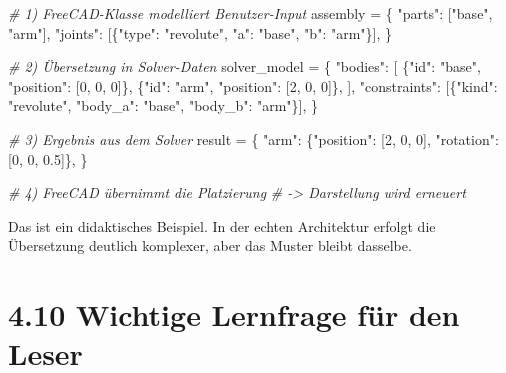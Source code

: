 \documentclass[
  12pt
]{book}
\newenvironment{Shaded}{}{}
\newcommand{\CommentTok}[1]{\textcolor[rgb]{0.38,0.63,0.69}{\textit{#1}}}
\newcommand{\DecValTok}[1]{\textcolor[rgb]{0.25,0.63,0.44}{#1}}
\newcommand{\FloatTok}[1]{\textcolor[rgb]{0.25,0.63,0.44}{#1}}
\newcommand{\NormalTok}[1]{#1}
\newcommand{\OperatorTok}[1]{\textcolor[rgb]{0.40,0.40,0.40}{#1}}
\newcommand{\StringTok}[1]{\textcolor[rgb]{0.25,0.44,0.63}{#1}}
\begin{document}
\begin{Shaded}
\begin{Highlighting}[]
\CommentTok{\# 1) FreeCAD{-}Klasse modelliert Benutzer{-}Input}
\NormalTok{assembly }\OperatorTok{=}\NormalTok{ \{}
    \StringTok{"parts"}\NormalTok{: [}\StringTok{"base"}\NormalTok{, }\StringTok{"arm"}\NormalTok{],}
    \StringTok{"joints"}\NormalTok{: [\{}\StringTok{"type"}\NormalTok{: }\StringTok{"revolute"}\NormalTok{, }\StringTok{"a"}\NormalTok{: }\StringTok{"base"}\NormalTok{, }\StringTok{"b"}\NormalTok{: }\StringTok{"arm"}\NormalTok{\}],}
\NormalTok{\}}

\CommentTok{\# 2) Übersetzung in Solver{-}Daten}
\NormalTok{solver\_model }\OperatorTok{=}\NormalTok{ \{}
    \StringTok{"bodies"}\NormalTok{: [}
\NormalTok{        \{}\StringTok{"id"}\NormalTok{: }\StringTok{"base"}\NormalTok{, }\StringTok{"position"}\NormalTok{: [}\DecValTok{0}\NormalTok{, }\DecValTok{0}\NormalTok{, }\DecValTok{0}\NormalTok{]\},}
\NormalTok{        \{}\StringTok{"id"}\NormalTok{: }\StringTok{"arm"}\NormalTok{, }\StringTok{"position"}\NormalTok{: [}\DecValTok{2}\NormalTok{, }\DecValTok{0}\NormalTok{, }\DecValTok{0}\NormalTok{]\},}
\NormalTok{    ],}
    \StringTok{"constraints"}\NormalTok{: [\{}\StringTok{"kind"}\NormalTok{: }\StringTok{"revolute"}\NormalTok{, }\StringTok{"body\_a"}\NormalTok{: }\StringTok{"base"}\NormalTok{, }\StringTok{"body\_b"}\NormalTok{: }\StringTok{"arm"}\NormalTok{\}],}
\NormalTok{\}}

\CommentTok{\# 3) Ergebnis aus dem Solver}
\NormalTok{result }\OperatorTok{=}\NormalTok{ \{}
    \StringTok{"arm"}\NormalTok{: \{}\StringTok{"position"}\NormalTok{: [}\DecValTok{2}\NormalTok{, }\DecValTok{0}\NormalTok{, }\DecValTok{0}\NormalTok{], }\StringTok{"rotation"}\NormalTok{: [}\DecValTok{0}\NormalTok{, }\DecValTok{0}\NormalTok{, }\FloatTok{0.5}\NormalTok{]\},}
\NormalTok{\}}

\CommentTok{\# 4) FreeCAD übernimmt die Platzierung}
\CommentTok{\# {-}\textgreater{} Darstellung wird erneuert}
\end{Highlighting}
\end{Shaded}

Das ist ein didaktisches Beispiel. In der echten Architektur erfolgt die
Übersetzung deutlich komplexer, aber das Muster bleibt dasselbe.

\hypertarget{wichtige-lernfrage-fuxfcr-den-leser}{%
\section{\texorpdfstring{{4.10} Wichtige Lernfrage für den
Leser}{4.10 Wichtige Lernfrage für den Leser}}\label{wichtige-lernfrage-fuxfcr-den-leser}}
\end{document}
